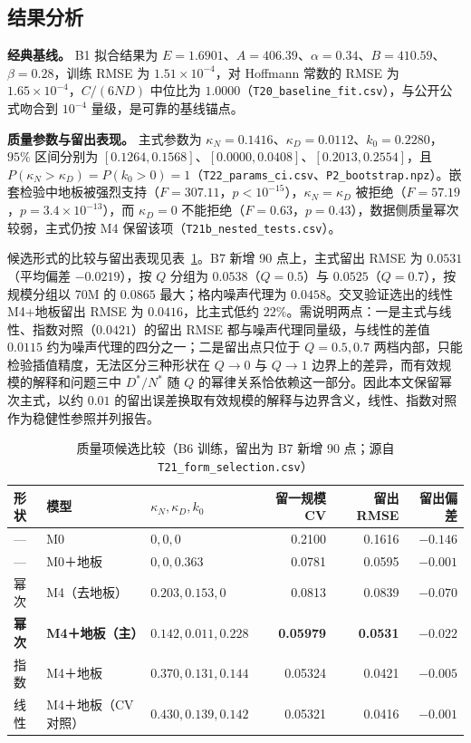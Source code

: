\subsection{结果分析}
\label{sec:5.3.7}

\textbf{经典基线。} B1 拟合结果为 $E=1.6901$、$A=406.39$、$\alpha=0.34$、$B=410.59$、$\beta=0.28$，训练 RMSE 为 $1.51\times10^{-4}$，对 Hoffmann 常数的 RMSE 为 $1.65\times10^{-4}$，$C/(6ND)$ 中位比为 $1.0000$（\texttt{T20\_baseline\_fit.csv}），与公开公式吻合到 $10^{-4}$ 量级，是可靠的基线锚点。

\textbf{质量参数与留出表现。} 主式参数为 $\kappa_N=0.1416$、$\kappa_D=0.0112$、$k_0=0.2280$，$95\%$ 区间分别为 $[0.1264,0.1568]$、$[0.0000,0.0408]$、$[0.2013,0.2554]$，且 $P(\kappa_N>\kappa_D)=P(k_0>0)=1$（\texttt{T22\_params\_ci.csv}、\texttt{P2\_bootstrap.npz}）。嵌套检验中地板被强烈支持（$F=307.11$，$p<10^{-15}$），$\kappa_N=\kappa_D$ 被拒绝（$F=57.19$，$p=3.4\times10^{-13}$），而 $\kappa_D=0$ 不能拒绝（$F=0.63$，$p=0.43$），数据侧质量幂次较弱，主式仍按 M4 保留该项（\texttt{T21b\_nested\_tests.csv}）。

候选形式的比较与留出表现见表~\ref{tab:q2form}。B7 新增 90 点上，主式留出 RMSE 为 $0.0531$（平均偏差 $-0.0219$），按 $Q$ 分组为 $0.0538$（$Q=0.5$）与 $0.0525$（$Q=0.7$），按规模分组以 70M 的 $0.0865$ 最大；格内噪声代理为 $0.0458$。交叉验证选出的线性 M4+地板留出 RMSE 为 $0.0416$，比主式低约 $22\%$。需说明两点：一是主式与线性、指数对照（$0.0421$）的留出 RMSE 都与噪声代理同量级，与线性的差值 $0.0115$ 约为噪声代理的四分之一；二是留出点只位于 $Q=0.5,0.7$ 两档内部，只能检验插值精度，无法区分三种形状在 $Q\to0$ 与 $Q\to1$ 边界上的差异，而有效规模的解释和问题三中 $D^*/N^*$ 随 $Q$ 的幂律关系恰依赖这一部分。因此本文保留幂次主式，以约 $0.01$ 的留出误差换取有效规模的解释与边界含义，线性、指数对照作为稳健性参照并列报告。

\begin{table}[H]
\centering\small
\caption{质量项候选比较（B6 训练，留出为 B7 新增 90 点；源自 \texttt{T21\_form\_selection.csv}）}
\label{tab:q2form}
\begin{tabularx}{\textwidth}{@{}lllrrr@{}}
\toprule
形状 & 模型 & $\kappa_N,\kappa_D,k_0$ & 留一规模 CV & 留出 RMSE & 留出偏差 \\
\midrule
— & M0 & $0,0,0$ & 0.2100 & 0.1616 & $-0.146$ \\
— & M0＋地板 & $0,0,0.363$ & 0.0781 & 0.0595 & $-0.001$ \\
幂次 & M4（去地板） & $0.203,0.153,0$ & 0.0813 & 0.0839 & $-0.070$ \\
\textbf{幂次} & \textbf{M4＋地板（主）} & $\mathbf{0.142,0.011,0.228}$ & \textbf{0.05979} & \textbf{0.0531} & $\mathbf{-0.022}$ \\
指数 & M4＋地板 & $0.370,0.131,0.144$ & 0.05324 & 0.0421 & $-0.005$ \\
线性 & M4＋地板（CV 对照） & $0.430,0.139,0.142$ & 0.05321 & 0.0416 & $-0.001$ \\
\bottomrule
\end{tabularx}
\end{table}

